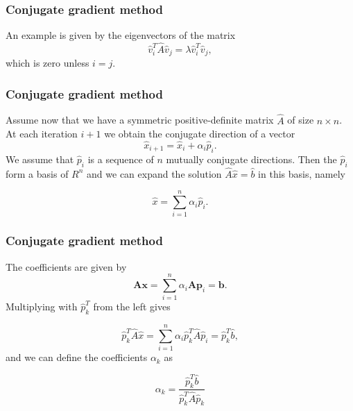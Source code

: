 \documentclass{beamer}
\begin{document}
\begin{frame}
\frametitle{Conjugate gradient method}

\begin{block}{}
An example is given by the eigenvectors of the matrix
\begin{equation*}
\hat{v}_i^T\hat{A}\hat{v}_j= \lambda\hat{v}_i^T\hat{v}_j,
\end{equation*}
which is zero unless $i=j$. 
\end{block}
\end{frame}

\begin{frame}
\frametitle{Conjugate gradient method}

\begin{block}{}
Assume now that we have a symmetric positive-definite matrix $\hat{A}$ of size
$n\times n$. At each iteration $i+1$ we obtain the conjugate direction of a vector
\begin{equation*}
\hat{x}_{i+1}=\hat{x}_{i}+\alpha_i\hat{p}_{i}. 
\end{equation*}
We assume that $\hat{p}_{i}$ is a sequence of $n$ mutually conjugate directions. 
Then the $\hat{p}_{i}$  form a basis of $R^n$ and we can expand the solution 
$  \hat{A}\hat{x} = \hat{b}$ in this basis, namely

\begin{equation*}
  \hat{x}  = \sum^{n}_{i=1} \alpha_i \hat{p}_i.
\end{equation*}
\end{block}
\end{frame}

\begin{frame}
\frametitle{Conjugate gradient method}

\begin{block}{}
The coefficients are given by
\begin{equation*}
    \mathbf{A}\mathbf{x} = \sum^{n}_{i=1} \alpha_i \mathbf{A} \mathbf{p}_i = \mathbf{b}.
\end{equation*}
Multiplying with $\hat{p}_k^T$  from the left gives

\begin{equation*}
  \hat{p}_k^T \hat{A}\hat{x} = \sum^{n}_{i=1} \alpha_i\hat{p}_k^T \hat{A}\hat{p}_i= \hat{p}_k^T \hat{b},
\end{equation*}
and we can define the coefficients $\alpha_k$ as

\begin{equation*}
    \alpha_k = \frac{\hat{p}_k^T \hat{b}}{\hat{p}_k^T \hat{A} \hat{p}_k}
\end{equation*}
\end{block}
\end{frame}
\end{document}
